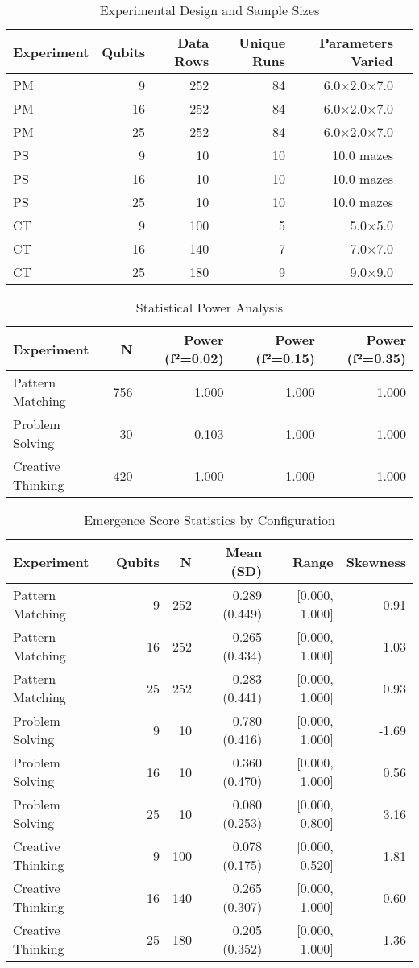 
\begin{table}[h]
\centering
\caption{Experimental Design and Sample Sizes}
\begin{tabular}{lrrrrr}
\toprule
Experiment & Qubits & Data Rows & Unique Runs & Parameters Varied \\
\midrule
PM & 9 & 252 & 84 & 6.0×2.0×7.0 \\
PM & 16 & 252 & 84 & 6.0×2.0×7.0 \\
PM & 25 & 252 & 84 & 6.0×2.0×7.0 \\
PS & 9 & 10 & 10 & 10.0 mazes \\
PS & 16 & 10 & 10 & 10.0 mazes \\
PS & 25 & 10 & 10 & 10.0 mazes \\
CT & 9 & 100 & 5 & 5.0×5.0 \\
CT & 16 & 140 & 7 & 7.0×7.0 \\
CT & 25 & 180 & 9 & 9.0×9.0 \\
\bottomrule
\end{tabular}
\end{table}

\begin{table}[h]
\centering
\caption{Statistical Power Analysis}
\begin{tabular}{lrrrr}
\toprule
Experiment & N & Power (f²=0.02) & Power (f²=0.15) & Power (f²=0.35) \\
\midrule
Pattern Matching & 756 & 1.000 & 1.000 & 1.000 \\
Problem Solving & 30 & 0.103 & 1.000 & 1.000 \\
Creative Thinking & 420 & 1.000 & 1.000 & 1.000 \\
\bottomrule
\end{tabular}
\end{table}

\begin{table}[h]
\centering
\caption{Emergence Score Statistics by Configuration}
\begin{tabular}{lrrrrr}
\toprule
Experiment & Qubits & N & Mean (SD) & Range & Skewness \\
\midrule
Pattern Matching & 9 & 252 & 0.289 (0.449) & [0.000, 1.000] & 0.91 \\
Pattern Matching & 16 & 252 & 0.265 (0.434) & [0.000, 1.000] & 1.03 \\
Pattern Matching & 25 & 252 & 0.283 (0.441) & [0.000, 1.000] & 0.93 \\
Problem Solving & 9 & 10 & 0.780 (0.416) & [0.000, 1.000] & -1.69 \\
Problem Solving & 16 & 10 & 0.360 (0.470) & [0.000, 1.000] & 0.56 \\
Problem Solving & 25 & 10 & 0.080 (0.253) & [0.000, 0.800] & 3.16 \\
Creative Thinking & 9 & 100 & 0.078 (0.175) & [0.000, 0.520] & 1.81 \\
Creative Thinking & 16 & 140 & 0.265 (0.307) & [0.000, 1.000] & 0.60 \\
Creative Thinking & 25 & 180 & 0.205 (0.352) & [0.000, 1.000] & 1.36 \\
\bottomrule
\end{tabular}
\end{table}

